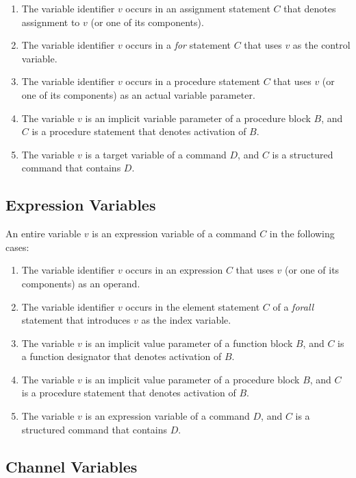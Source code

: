 \begin{enumerate}
  \item
  The variable identifier $v$ occurs in an assignment
  statement $C$ that denotes assignment to $v$ (or one of
  its components).
  \item
  The variable identifier $v$ occurs in a {\it for}
  statement $C$ that uses $v$ as the control variable.
  \item
  The variable identifier $v$ occurs in a procedure
  statement $C$  that uses $v$ (or one of its components) as
  an actual variable parameter.
  \item
  The variable $v$ is an implicit variable parameter of a
  procedure block $B$, and $C$ is a procedure statement that
  denotes activation of $B$.
  \item
  The variable $v$ is a target variable of a command $D$,
  and $C$ is a structured command that contains $D$.
\end{enumerate}


\subsection{Expression Variables}

An entire variable $v$ is an expression variable of a
command $C$ in the following cases:

\begin{enumerate}
  \item
  The variable identifier $v$ occurs in an expression $C$
  that uses $v$ (or one of its components) as an operand.
  \item
  The variable identifier $v$ occurs in the element
  statement $C$ of a {\it forall} statement that introduces
  $v$ as the index variable.
  \item
  The variable $v$ is an implicit value parameter of a
  function block $B$, and $C$ is a function designator that
  denotes activation of $B$.
  \item
  The variable $v$ is an implicit value parameter of a
  procedure block $B$, and $C$ is a procedure statement that
  denotes activation of $B$.
  \item
  The variable $v$ is an expression variable of a command
  $D$, and $C$ is a structured command that contains $D$.
\end{enumerate}


\subsection{Channel Variables}


